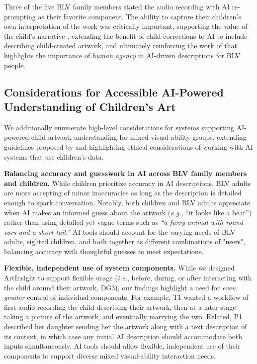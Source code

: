 \documentclass[sigconf]{acmart}
\begin{document}
Three of the five BLV family members stated the audio recording with AI re-prompting as their favorite component. The ability to capture their children's own interpretation of the work was critically important, supporting the value of the child's narrative \cite{chhedakothary2024}, extending the benefit of child corrections to AI \cite{darth_vader} to include describing child-created artwork, and ultimately reinforcing the work of \citet{bennett_itscomplicated} that highlights the importance of \textit{human agency} in AI-driven descriptions for BLV people.

\subsection{Considerations for Accessible AI-Powered Understanding of Children's Art}
We additionally enumerate high-level considerations for systems supporting AI-powered child artwork understanding for mixed visual-ability groups, extending guidelines proposed by \citet{chhedakothary2024} and highlighting ethical considerations of working with AI systems that use children's data.

\textbf{Balancing accuracy and guesswork in AI across BLV family members and children.} While children prioritize accuracy in AI descriptions, BLV adults are more accepting of minor inaccuracies as long as the description is detailed enough to spark conversation. Notably, both children and BLV adults appreciate when AI makes an informed guess about the artwork (\textit{e.g.}, ``it looks like a bear'') rather than using detailed yet vague terms such as \textit{``a furry animal with round ears and a short tail.''} AI tools should account for the varying needs of BLV adults, sighted children, and both together as different combinations of "users", balancing accuracy with thoughtful guesses to meet expectations.

\textbf{Flexible, independent use of system components.} While we designed ArtInsight to support flexible usage (\textit{i.e.}, before, during, or after interacting with the child around their artwork, DG3), our findings highlight a need for \textit{even greater} control of individual components. For example, T1 wanted a workflow of first audio-recording the child describing their artwork, then at a later stage taking a picture of the artwork, and eventually marrying the two. Related, P1 described her daughter sending her the artwork along with a text description of its context, in which case any initial AI description should accommodate both inputs simultaneously. AI tools should allow flexible, independent use of their components to support diverse mixed visual-ability interaction needs.
\end{document}
